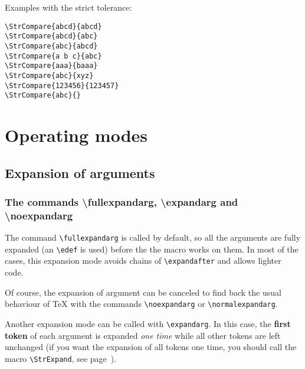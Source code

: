 \documentclass[a4paper,10pt]{article}
\newcommand\styleexemple{\small\vskip4pt}
\newcommand\verbinline{\lstinline[basicstyle=\normalsize\ttfamily]}
\begin{document}
Examples with the strict tolerance:\par\nobreak
\begin{minipage}[t]{0.65\linewidth}
\comparestrict
\begin{lstlisting}
\StrCompare{abcd}{abcd}
\StrCompare{abcd}{abc}
\StrCompare{abc}{abcd}
\StrCompare{a b c}{abc}
\StrCompare{aaa}{baaa}
\StrCompare{abc}{xyz}
\StrCompare{123456}{123457}
\StrCompare{abc}{}
\end{lstlisting}%
\end{minipage}\hfill
\begin{minipage}[t]{0.35\linewidth}
	\styleexemple
	\comparestrict
	\par
	\par
	\par
	\par
	\par
	\par
	\par
\end{minipage}%

\section{Operating modes}
\subsection{Expansion of arguments}
\label{devarg}
\subsubsection{The commands {\ttfamily \textbackslash fullexpandarg}, {\ttfamily \textbackslash expandarg} and {\ttfamily \textbackslash noexpandarg}}
The command \verbinline|\fullexpandarg| is called by default, so all the arguments are fully expanded (an \verbinline|\edef| is used) before the the macro works on them. In most of the cases, this expansion mode avoids chains of \verbinline|\expandafter| and allows lighter code.

Of course, the expansion of argument can be canceled to find back the usual behaviour of \TeX{} with the commands \verbinline|\noexpandarg| or \verbinline|\normalexpandarg|.\medskip

Another expansion mode can be called with \verbinline|\expandarg|. In this case, the \textbf{first token} of each argument is expanded \emph{one time} while all other tokens are left unchanged (if you want the expansion of all tokens one time, you should call the macro \verbinline|\StrExpand|, see page~\pageref{scancs}).\medskip
\end{document}
